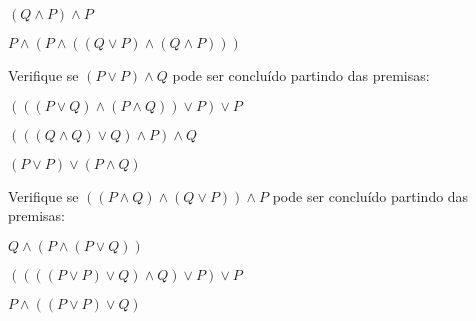 \documentclass{lib/unichristusdoc}
\begin{document}
\subproblem $  ( Q \land P ) \land P  $

\subproblem $  P \land ( P \land ( ( Q \lor P ) \land ( Q \land P ) ) )  $

\vspace{1cm}\problem Verifique se $  ( P \lor P ) \land Q  $ pode ser concluído partindo das premisas: 

\subproblem $  ( ( ( P \lor Q ) \land ( P \land Q ) ) \lor P ) \lor P  $

\subproblem $  ( ( ( Q \land Q ) \lor Q ) \land P ) \land Q  $

\subproblem $  ( P \lor P ) \lor ( P \land Q )  $

\vspace{1cm}\problem Verifique se $  ( ( P \land Q ) \land ( Q \lor P ) ) \land P  $ pode ser concluído partindo das premisas: 

\subproblem $  Q \land ( P \land ( P \lor Q ) )  $

\subproblem $  ( ( ( ( P \lor P ) \lor Q ) \land Q ) \lor P ) \lor P  $

\subproblem $  P \land ( ( P \lor P ) \lor Q )  $
\end{document}
